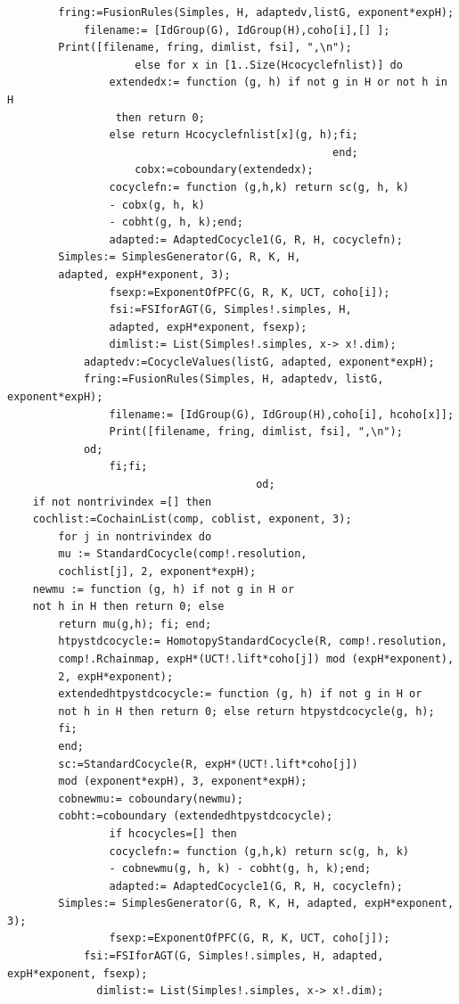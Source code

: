 \documentclass[a4paper, 10pt]{book}
\theoremstyle{definition}
\numberwithin{equation}{chapter}
\begin{document}
\begin{lstlisting}
		fring:=FusionRules(Simples, H, adaptedv,listG, exponent*expH);
	        filename:= [IdGroup(G), IdGroup(H),coho[i],[] ];
		Print([filename, fring, dimlist, fsi], ",\n");
                    else for x in [1..Size(Hcocyclefnlist)] do
                extendedx:= function (g, h) if not g in H or not h in H
                 then return 0;
                else return Hcocyclefnlist[x](g, h);fi;
                                                   end;
                    cobx:=coboundary(extendedx);
          	    cocyclefn:= function (g,h,k) return sc(g, h, k)  
          	    - cobx(g, h, k) 
          	    - cobht(g, h, k);end; 
                adapted:= AdaptedCocycle1(G, R, H, cocyclefn);
		Simples:= SimplesGenerator(G, R, K, H, 
		adapted, expH*exponent, 3);
                fsexp:=ExponentOfPFC(G, R, K, UCT, coho[i]);
                fsi:=FSIforAGT(G, Simples!.simples, H, 
                adapted, expH*exponent, fsexp);
                dimlist:= List(Simples!.simples, x-> x!.dim);
	        adaptedv:=CocycleValues(listG, adapted, exponent*expH); 
	        fring:=FusionRules(Simples, H, adaptedv, listG, exponent*expH);
                filename:= [IdGroup(G), IdGroup(H),coho[i], hcoho[x]];
                Print([filename, fring, dimlist, fsi], ",\n");
	        od;
                fi;fi;
                                       od;
	if not nontrivindex =[] then
	cochlist:=CochainList(comp, coblist, exponent, 3);
        for j in nontrivindex do
        mu := StandardCocycle(comp!.resolution, 
        cochlist[j], 2, exponent*expH);
	newmu := function (g, h) if not g in H or 
	not h in H then return 0; else 
		return mu(g,h); fi; end;
		htpystdcocycle:= HomotopyStandardCocycle(R, comp!.resolution, 
		comp!.Rchainmap, expH*(UCT!.lift*coho[j]) mod (expH*exponent), 
		2, expH*exponent);
		extendedhtpystdcocycle:= function (g, h) if not g in H or 
		not h in H then return 0; else return htpystdcocycle(g, h);
		fi;
		end;
		sc:=StandardCocycle(R, expH*(UCT!.lift*coho[j])
		mod (exponent*expH), 3, exponent*expH);
		cobnewmu:= coboundary(newmu);
		cobht:=coboundary (extendedhtpystdcocycle);
                if hcocycles=[] then
          	    cocyclefn:= function (g,h,k) return sc(g, h, k) 
          	    - cobnewmu(g, h, k) - cobht(g, h, k);end;
                adapted:= AdaptedCocycle1(G, R, H, cocyclefn);
		Simples:= SimplesGenerator(G, R, K, H, adapted, expH*exponent, 3);
                fsexp:=ExponentOfPFC(G, R, K, UCT, coho[j]);
            fsi:=FSIforAGT(G, Simples!.simples, H, adapted, expH*exponent, fsexp);
		      dimlist:= List(Simples!.simples, x-> x!.dim);

\end{lstlisting}
\end{document}
